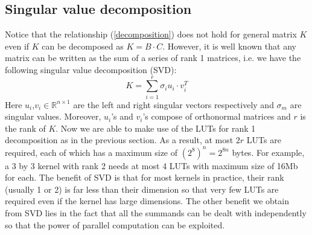 \documentclass[12pt]{amsart}
\theoremstyle{definition}
\theoremstyle{remark}
\numberwithin{thm}{section}
\begin{document}
\subsection{Singular value decomposition}
Notice that the relationship (\ref{decomposition}) does not hold for general matrix $K$ even if $K$ can be decomposed as $K=B\cdot C$. However, it is well known that any matrix can be written as the sum of a series of rank 1 matrices, i.e. we have the following singular value decomposition (SVD): 
\[K=\sum_{i=1}^{r}\sigma_i u_i\cdot v_i^T\]
Here $u_i$,$v_i\in\mathbb{R}^{n\times 1}$ are the left and right singular vectors respectively and $\sigma_m$ are singular values. Moreover, $u_i$'s and $v_i$'s compose of orthonormal matrices and $r$ is the rank of $K$. Now we are able to make use of the LUTs for rank 1 decomposition as in the previous section. As a result, at most $2r$ LUTs are required, each of which has a maximum size of $(2^8)^n=2^{8n}$ bytes. For example, a 3 by 3 kernel with rank 2 needs at most 4 LUTs with maximum size of 16Mb for each. The benefit of SVD is that for most kernels in practice, their rank (usually 1 or 2) is far less than their dimension so that very few LUTs are required even if the kernel has large dimensions. The other benefit we obtain from SVD lies in the fact that all the summands can be dealt with independently so that the power of parallel computation can be exploited. 
\end{document}
